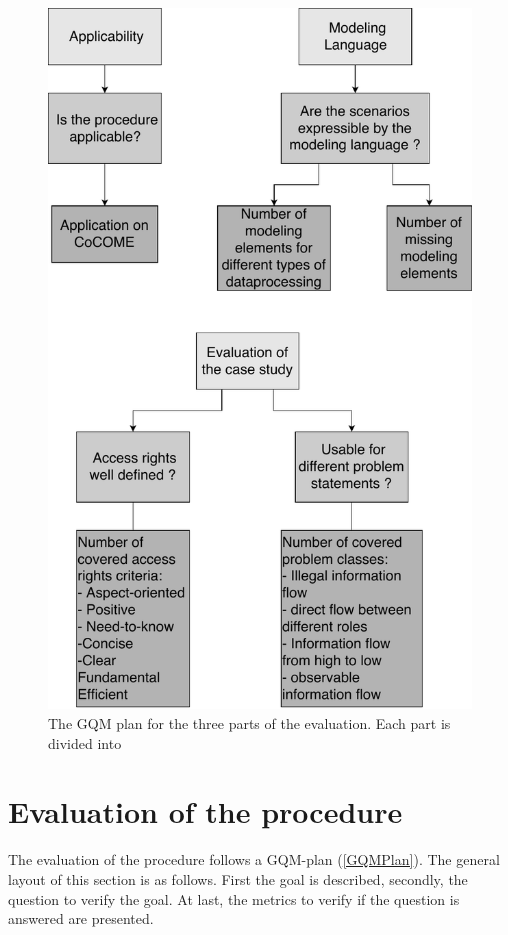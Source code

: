 \begin{figure}
\includegraphics[scale=.8, origin=c ]{logos/OverviewEval.pdf}
\caption{The GQM plan for the three parts of the evaluation. Each part is divided into }
\label{GQMPlan}
\end{figure}
\section{Evaluation of the procedure}
The evaluation of the procedure follows a GQM-plan (\autoref{GQMPlan}). The general layout of this section is as follows. First the goal is described, secondly, the question to verify the goal. At last, the metrics to verify if the question is answered are presented.
